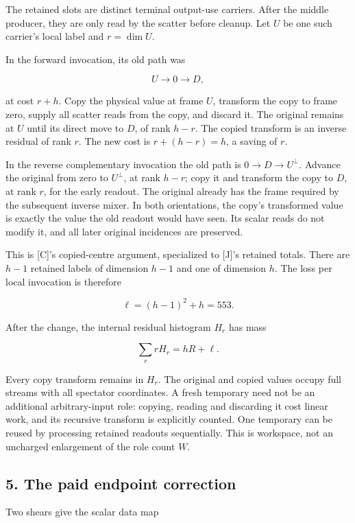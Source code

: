 \documentclass[
  11pt,
]{article}
\begin{document}
The retained slots are distinct terminal output-use carriers. After the
middle producer, they are only read by the scatter before cleanup. Let
\(U\) be one such carrier's local label and \(r=\dim U\).

In the forward invocation, its old path was

\[
 U\longrightarrow0\longrightarrow D,
\]

at cost \(r+h\). Copy the physical value at frame \(U\), transform the
copy to frame zero, supply all scatter reads from the copy, and discard
it. The original remains at \(U\) until its direct move to \(D\), of
rank \(h-r\). The copied transform is an inverse residual of rank \(r\).
The new cost is \(r+(h-r)=h\), a saving of \(r\).

In the reverse complementary invocation the old path is
\(0\to D\to U^\perp\). Advance the original from zero to \(U^\perp\), at
rank \(h-r\); copy it and transform the copy to \(D\), at rank \(r\),
for the early readout. The original already has the frame required by
the subsequent inverse mixer. In both orientations, the copy's
transformed value is exactly the value the old readout would have seen.
Its scalar reads do not modify it, and all later original incidences are
preserved.

This is {[}C{]}'s copied-centre argument, specialized to {[}J{]}'s
retained totals. There are \(h-1\) retained labels of dimension \(h-1\)
and one of dimension \(h\). The loss per local invocation is therefore

\[
 \ell=(h-1)^2+h=553.
\]

After the change, the internal residual histogram \(H_r\) has mass

\[
 \sum_r rH_r=hR+\ell.
 \tag{4.1}
\]

Every copy transform remains in \(H_r\). The original and copied values
occupy full streams with all spectator coordinates. A fresh temporary
need not be an additional arbitrary-input role: copying, reading and
discarding it cost linear work, and its recursive transform is
explicitly counted. One temporary can be reused by processing retained
readouts sequentially. This is workspace, not an uncharged enlargement
of the role count \(W\).

\subsection{5. The paid endpoint
correction}\label{the-paid-endpoint-correction}

Two shears give the scalar data map
\end{document}
